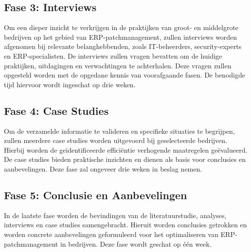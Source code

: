 \subsection{Fase 3: Interviews}

Om een dieper inzicht te verkrijgen in de praktijken van groot- en middelgrote bedrijven op het gebied van ERP-patchmanagement, zullen interviews worden afgenomen bij relevante belanghebbenden, zoals IT-beheerders, security-experts en ERP-specialisten. De interviews zullen vragen bevatten om de huidige praktijken, uitdagingen en verwachtingen te achterhalen. Deze vragen zullen opgesteld worden met de opgedane kennis van voorafgaande fasen. De benodigde tijd hiervoor wordt ingeschat op drie weken.

\subsection{Fase 4: Case Studies}

Om de verzamelde informatie te valideren en specifieke situaties te begrijpen, zullen meerdere case studies worden uitgevoerd bij geselecteerde bedrijven. Hierbij worden de geïdentificeerde efficiëntie verhogende maatregelen geëvalueerd. De case studies bieden praktische inzichten en dienen als basis voor conclusies en aanbevelingen. Deze fase zal ongeveer drie weken in beslag nemen.

\subsection{Fase 5: Conclusie en Aanbevelingen}

In de laatste fase worden de bevindingen van de literatuurstudie, analyses, interviews en case studies samengebracht. Hieruit worden conclusies getrokken en worden concrete aanbevelingen geformuleerd voor het optimaliseren van ERP-patchmanagement in bedrijven. Deze fase wordt geschat op één week. \\

